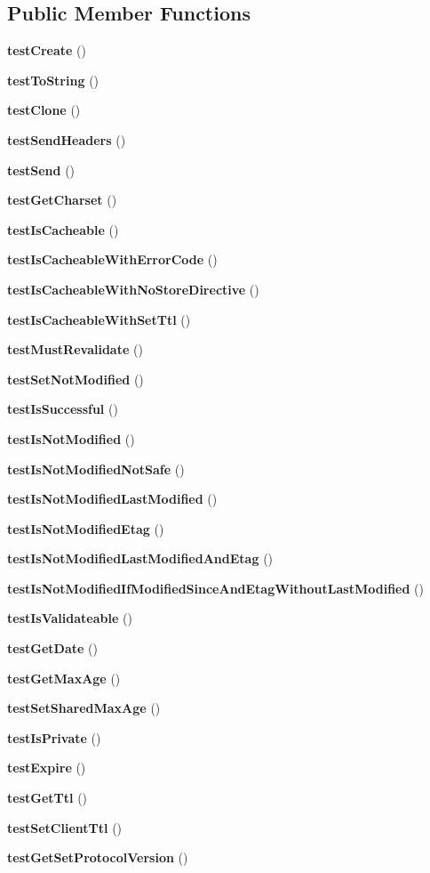 \subsection*{Public Member Functions}
\begin{DoxyCompactItemize}
\item 
{\bf test\+Create} ()
\item 
{\bf test\+To\+String} ()
\item 
{\bf test\+Clone} ()
\item 
{\bf test\+Send\+Headers} ()
\item 
{\bf test\+Send} ()
\item 
{\bf test\+Get\+Charset} ()
\item 
{\bf test\+Is\+Cacheable} ()
\item 
{\bf test\+Is\+Cacheable\+With\+Error\+Code} ()
\item 
{\bf test\+Is\+Cacheable\+With\+No\+Store\+Directive} ()
\item 
{\bf test\+Is\+Cacheable\+With\+Set\+Ttl} ()
\item 
{\bf test\+Must\+Revalidate} ()
\item 
{\bf test\+Set\+Not\+Modified} ()
\item 
{\bf test\+Is\+Successful} ()
\item 
{\bf test\+Is\+Not\+Modified} ()
\item 
{\bf test\+Is\+Not\+Modified\+Not\+Safe} ()
\item 
{\bf test\+Is\+Not\+Modified\+Last\+Modified} ()
\item 
{\bf test\+Is\+Not\+Modified\+Etag} ()
\item 
{\bf test\+Is\+Not\+Modified\+Last\+Modified\+And\+Etag} ()
\item 
{\bf test\+Is\+Not\+Modified\+If\+Modified\+Since\+And\+Etag\+Without\+Last\+Modified} ()
\item 
{\bf test\+Is\+Validateable} ()
\item 
{\bf test\+Get\+Date} ()
\item 
{\bf test\+Get\+Max\+Age} ()
\item 
{\bf test\+Set\+Shared\+Max\+Age} ()
\item 
{\bf test\+Is\+Private} ()
\item 
{\bf test\+Expire} ()
\item 
{\bf test\+Get\+Ttl} ()
\item 
{\bf test\+Set\+Client\+Ttl} ()
\item 
{\bf test\+Get\+Set\+Protocol\+Version} ()
\item 

\end{DoxyCompactItemize}
